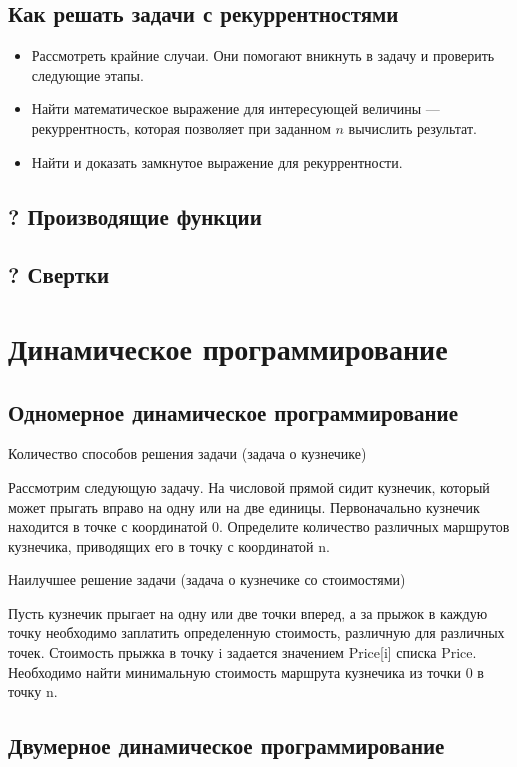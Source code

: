 \documentclass[14pt]{book}
\begin{document}
\section{Как решать задачи с рекуррентностями}

\begin{itemize}
\item Рассмотреть крайние случаи. Они помогают вникнуть в задачу и проверить
      следующие этапы.
\item Найти математическое выражение для интересующей величины ---
      рекуррентность, которая позволяет при заданном $n$ вычислить результат.
\item Найти и доказать замкнутое выражение для рекуррентности.
\end{itemize}



\section{? Производящие функции}
\section{? Свертки}

\chapter{Динамическое программирование}
\section{Одномерное динамическое программирование}
Количество способов решения задачи (задача о кузнечике)

Рассмотрим следующую задачу. На числовой прямой сидит кузнечик, который может прыгать вправо на одну или на две единицы. Первоначально кузнечик находится в точке с координатой 0. Определите количество различных маршрутов кузнечика, приводящих его в точку с координатой n.

Наилучшее решение задачи (задача о кузнечике со стоимостями)

Пусть кузнечик прыгает на одну или две точки вперед, а за прыжок в каждую точку необходимо заплатить определенную стоимость, различную для различных точек. Стоимость прыжка в точку i задается значением Price[i] списка Price. Необходимо найти минимальную стоимость маршрута кузнечика из точки 0 в точку n.

\section{Двумерное динамическое программирование}
\end{document}
